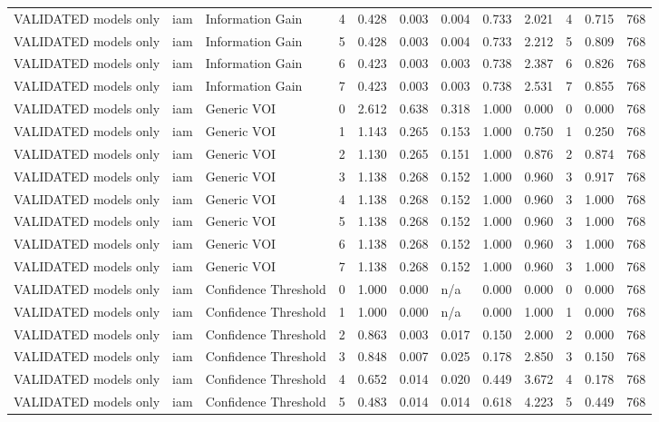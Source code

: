 \begin{table}[!ht]
{\begin{tabular}{llllllllllll}
VALIDATED models only & iam & Information Gain & 4 & 0.428 & 0.003 & 0.004 & 0.733 & 2.021 & 4 & 0.715 & 768 \\
VALIDATED models only & iam & Information Gain & 5 & 0.428 & 0.003 & 0.004 & 0.733 & 2.212 & 5 & 0.809 & 768 \\
VALIDATED models only & iam & Information Gain & 6 & 0.423 & 0.003 & 0.003 & 0.738 & 2.387 & 6 & 0.826 & 768 \\
VALIDATED models only & iam & Information Gain & 7 & 0.423 & 0.003 & 0.003 & 0.738 & 2.531 & 7 & 0.855 & 768 \\
VALIDATED models only & iam & Generic VOI & 0 & 2.612 & 0.638 & 0.318 & 1.000 & 0.000 & 0 & 0.000 & 768 \\
VALIDATED models only & iam & Generic VOI & 1 & 1.143 & 0.265 & 0.153 & 1.000 & 0.750 & 1 & 0.250 & 768 \\
VALIDATED models only & iam & Generic VOI & 2 & 1.130 & 0.265 & 0.151 & 1.000 & 0.876 & 2 & 0.874 & 768 \\
VALIDATED models only & iam & Generic VOI & 3 & 1.138 & 0.268 & 0.152 & 1.000 & 0.960 & 3 & 0.917 & 768 \\
VALIDATED models only & iam & Generic VOI & 4 & 1.138 & 0.268 & 0.152 & 1.000 & 0.960 & 3 & 1.000 & 768 \\
VALIDATED models only & iam & Generic VOI & 5 & 1.138 & 0.268 & 0.152 & 1.000 & 0.960 & 3 & 1.000 & 768 \\
VALIDATED models only & iam & Generic VOI & 6 & 1.138 & 0.268 & 0.152 & 1.000 & 0.960 & 3 & 1.000 & 768 \\
VALIDATED models only & iam & Generic VOI & 7 & 1.138 & 0.268 & 0.152 & 1.000 & 0.960 & 3 & 1.000 & 768 \\
VALIDATED models only & iam & Confidence Threshold & 0 & 1.000 & 0.000 & n/a & 0.000 & 0.000 & 0 & 0.000 & 768 \\
VALIDATED models only & iam & Confidence Threshold & 1 & 1.000 & 0.000 & n/a & 0.000 & 1.000 & 1 & 0.000 & 768 \\
VALIDATED models only & iam & Confidence Threshold & 2 & 0.863 & 0.003 & 0.017 & 0.150 & 2.000 & 2 & 0.000 & 768 \\
VALIDATED models only & iam & Confidence Threshold & 3 & 0.848 & 0.007 & 0.025 & 0.178 & 2.850 & 3 & 0.150 & 768 \\
VALIDATED models only & iam & Confidence Threshold & 4 & 0.652 & 0.014 & 0.020 & 0.449 & 3.672 & 4 & 0.178 & 768 \\
VALIDATED models only & iam & Confidence Threshold & 5 & 0.483 & 0.014 & 0.014 & 0.618 & 4.223 & 5 & 0.449 & 768 \\

\end{tabular}}
\end{table}
